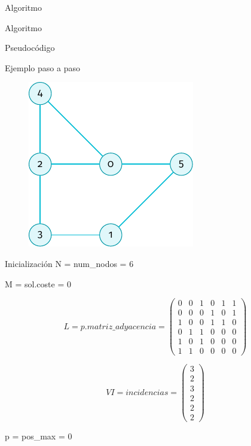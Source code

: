\documentclass[spanish]{beamer}
\begin{document}
\begin{frame}{Algoritmo}
	
\end{frame}

\begin{frame}{Algoritmo}
	
\end{frame}

\begin{frame}{Pseudocódigo}


\end{frame}

\begin{frame}{Ejemplo paso a paso}
	\begin{figure}[H]
		\centering \includegraphics{./img/grafo-ejemplo-sin-recubrir.pdf}
	\end{figure}

\end{frame}

\begin{frame}{Inicialización}
	N = num\_nodos = 6
	
	M = sol.coste = 0
	
	$$  L = p.matriz\_adyacencia = 
\begin{pmatrix}
  0 & 0 & 1 & 0 & 1 & 1 \\
  0 & 0 & 0 & 1 & 0 & 1 \\
  1 & 0 & 0 & 1 & 1 & 0 \\
  0 & 1 & 1 & 0 & 0 & 0 \\
  1 & 0 & 1 & 0 & 0 & 0 \\
  1 & 1 & 0 & 0 & 0 & 0
\end{pmatrix}$$

	$$  VI = incidencias = 
\begin{pmatrix}
  3 \\
  2 \\
  3 \\
  2 \\
  2 \\
  2
\end{pmatrix}$$

	p = pos\_max = 0
	
\end{frame}
\end{document}

